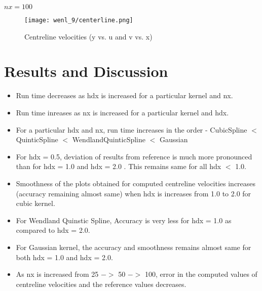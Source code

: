 \documentclass{article}
\begin{document}
\newpage
$nx = 100 $
\\
\begin{figure}[H]   \label{figure}
\texttt{[image: wenl\_9/centerline.png]}
\caption{Centreline velocities (y vs. u and v vs. x)}
\label{figure:}
\end{figure}

\section{Results and Discussion}

\begin{itemize}
  \item Run time decreases as hdx is increased for a particular kernel and nx.
  \item Run time inreases as nx is increased for a particular kernel and hdx.
  \item For a particular hdx and nx, run time increases in the order - CubicSpline $<$ QuinticSpline $<$ WendlandQuinticSpline $<$ Gaussian
  \item For hdx = 0.5, deviation of results from reference is much more pronounced than for hdx = 1.0 and hdx = 2.0 . This remains same for all hdx $<$ 1.0.
  \item Smoothness of the plots obtained for computed centreline velocities increases (accuracy remaining almost same) when hdx is increases from 1.0 to 2.0 for cubic kernel.
  \item For Wendland Quinstic Spline, Accuracy is very less for hdx = 1.0 as compared to hdx = 2.0.
  \item For Gaussian kernel, the accuracy and smoothness remains almost same for both hdx = 1.0 and hdx = 2.0.
  \item As nx is increased from 25 $->$ 50 $->$ 100, error in the computed values of centreline velocities and the reference values decreases.
\end{itemize}
\end{document}

